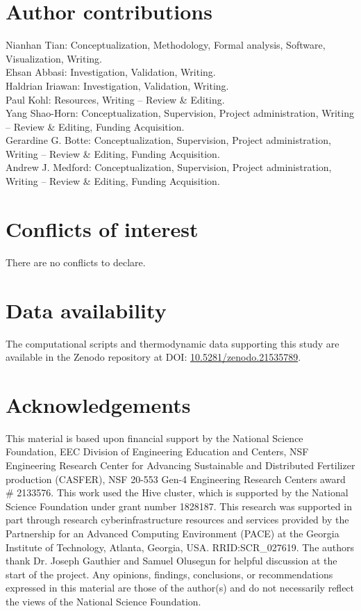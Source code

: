 \documentclass[twoside,twocolumn,9pt]{article}
\begin{document}
\section*{Author contributions}
Nianhan Tian: Conceptualization, Methodology, Formal analysis, Software, Visualization, Writing.  \\
Ehsan Abbasi: Investigation, Validation, Writing.  \\
Haldrian Iriawan: Investigation, Validation, Writing.  \\
Paul Kohl: Resources, Writing -- Review \& Editing.  \\
Yang Shao-Horn: Conceptualization, Supervision, Project administration, Writing -- Review \& Editing, Funding Acquisition.  \\
Gerardine G. Botte: Conceptualization, Supervision, Project administration, Writing -- Review \& Editing, Funding Acquisition.  \\
Andrew J. Medford: Conceptualization, Supervision, Project administration, Writing -- Review \& Editing, Funding Acquisition. \\


\section*{Conflicts of interest}
There are no conflicts to declare.

\section*{Data availability}
The computational scripts and thermodynamic data supporting this study are available in the Zenodo repository at DOI: \href{https://doi.org/10.5281/zenodo.21535789}{10.5281/zenodo.21535789}.




\section*{Acknowledgements}
This material is based upon financial support by the National Science Foundation, EEC Division of Engineering Education and Centers, NSF Engineering Research Center for Advancing Sustainable and Distributed Fertilizer production (CASFER), NSF 20-553 Gen-4 Engineering Research Centers award \# 2133576. This work used the Hive cluster, which is supported by the National Science Foundation under grant number 1828187.  This research was supported in part through research cyberinfrastructure resources and services provided by the Partnership for an Advanced Computing Environment (PACE) at the Georgia Institute of Technology, Atlanta, Georgia, USA. RRID:SCR\_027619. The authors thank Dr. Joseph Gauthier and Samuel Olusegun for helpful discussion at the start of the project. Any opinions, findings, conclusions, or recommendations expressed in this material are those of the author(s) and do not necessarily reflect the views of the National Science Foundation. 
\end{document}
